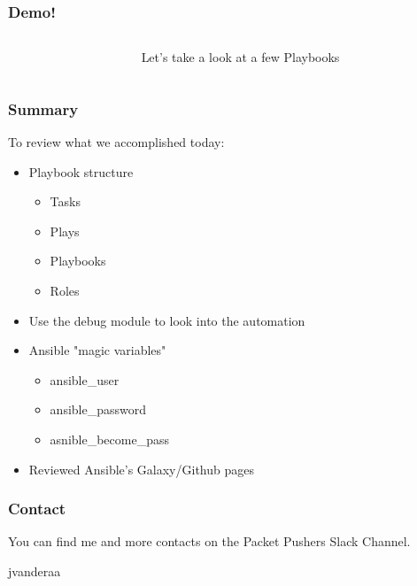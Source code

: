 \documentclass{beamer}
\begin{document}
\begin{frame}
  \frametitle{Demo!}
  \begin{columns}
    \begin{column}{0.3\textwidth}
      \Huge
      \begin{center}
        \faDesktop 
        \hspace{.5cm}
        \faRocket     
      \end{center}
    \end{column}
    \begin{column}{0.7\textwidth}
      \huge 
      Let's take a look at a few Playbooks
    \end{column}
  \end{columns}
\end{frame}

\begin{frame}
  \frametitle{Summary}
    To review what we accomplished today:
    \begin{itemize}
      \item <1-> Playbook structure
      \begin{itemize}
        \item <2-> Tasks
        \item <2-> Plays
        \item <2-> Playbooks
        \item <2-> Roles
      \end{itemize}
      \item <3-> Use the debug module to look into the automation
      \item <4-> Ansible "magic variables"
      \begin{itemize}
        \item <5-> ansible\_user
        \item <5-> ansible\_password
        \item <5-> asnible\_become\_pass
      \end{itemize}
      \item <6-> Reviewed Ansible's Galaxy/Github pages
    \end{itemize}
\end{frame}

\begin{frame}
  \frametitle{Contact}
  \huge
  You can find me and more contacts on the Packet Pushers Slack Channel. 
  \linebreak
  \begin{center}
    \normalsize
    \faSlack \hspace{.1cm}jvanderaa  
  \end{center}
  
\end{frame}
\end{document}

